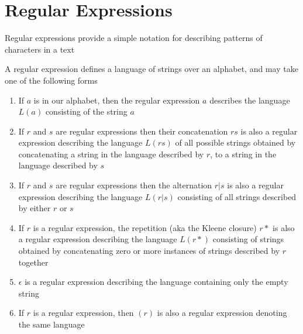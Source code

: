 \documentclass[8pt,a4paper,compress]{beamer}
\begin{document}
\section{Regular Expressions}
\begin{frame}[fragile]
\pause

Regular expressions provide a simple notation for describing patterns of characters in a text

\pause
\bigskip

A regular expression defines a language of strings over an alphabet, and may take one of the following forms
\begin{enumerate}
\item If $a$ is in our alphabet, then the regular expression $a$ describes the language $L(a)$ consisting of the string $a$

\item If $r$ and $s$ are regular expressions then their concatenation $rs$ is also a regular expression describing the language $L(rs)$ of all possible strings obtained by concatenating a string in the language described by $r$, to a string in the language described by $s$

\item If $r$ and $s$ are regular expressions then the alternation $r|s$ is also a regular expression describing the language $L(r|s)$ consisting of all strings described by either $r$ or $s$

\item If $r$ is a regular expression, the repetition (aka the Kleene closure) $r*$ is also a regular expression describing the language $L(r*)$ consisting of strings obtained by concatenating zero or more instances of strings described by $r$ together

\item $\epsilon$ is a regular expression describing the language containing only the empty string

\item If $r$ is a regular expression, then $(r)$ is also a regular expression denoting the same language
\end{enumerate}
\end{frame}
\end{document}
